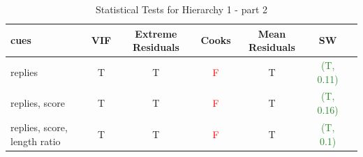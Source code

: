 \documentclass[11pt, oneside]{article}   	%
\begin{document}
\begin{table}[H]
  \begin{center}
  \begin{tabular}{|l|c|c|c|c|c|c|}
    \hline
    cues & VIF & Extreme Residuals & Cooks & Mean Residuals & SW \\
    \hline
    replies  & T & T & \textcolor{red}F & T & \textcolor{ForestGreen}{(T, 0.11)} \\
    replies, score & T & T & \textcolor{red}F & T & \textcolor{ForestGreen}{(T, 0.16)} \\
    replies, score, length ratio & T & T & \textcolor{red}F & T & \textcolor{ForestGreen}{(T, 0.1)} \\
    \hline
  \end{tabular}
  \caption{Statistical Tests for Hierarchy 1 - part 2}
  \end{center}
\end{table}
\end{document}
